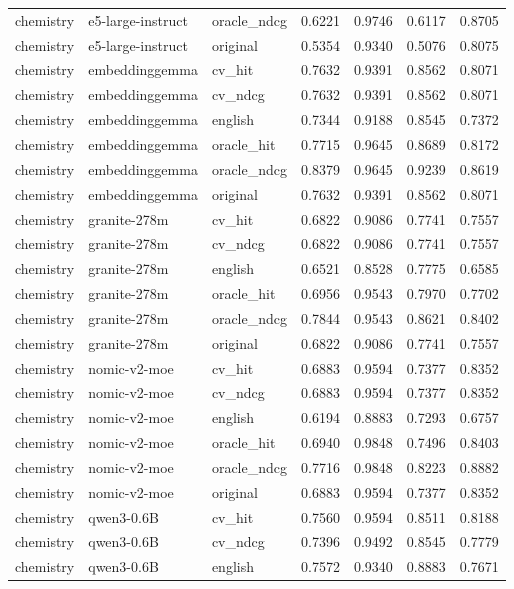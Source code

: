 \begin{tabular}{lllrrrr}
chemistry & e5-large-instruct & oracle\_ndcg & 0.6221 & 0.9746 & 0.6117 & 0.8705 \\
chemistry & e5-large-instruct & original & 0.5354 & 0.9340 & 0.5076 & 0.8075 \\
chemistry & embeddinggemma & cv\_hit & 0.7632 & 0.9391 & 0.8562 & 0.8071 \\
chemistry & embeddinggemma & cv\_ndcg & 0.7632 & 0.9391 & 0.8562 & 0.8071 \\
chemistry & embeddinggemma & english & 0.7344 & 0.9188 & 0.8545 & 0.7372 \\
chemistry & embeddinggemma & oracle\_hit & 0.7715 & 0.9645 & 0.8689 & 0.8172 \\
chemistry & embeddinggemma & oracle\_ndcg & 0.8379 & 0.9645 & 0.9239 & 0.8619 \\
chemistry & embeddinggemma & original & 0.7632 & 0.9391 & 0.8562 & 0.8071 \\
chemistry & granite-278m & cv\_hit & 0.6822 & 0.9086 & 0.7741 & 0.7557 \\
chemistry & granite-278m & cv\_ndcg & 0.6822 & 0.9086 & 0.7741 & 0.7557 \\
chemistry & granite-278m & english & 0.6521 & 0.8528 & 0.7775 & 0.6585 \\
chemistry & granite-278m & oracle\_hit & 0.6956 & 0.9543 & 0.7970 & 0.7702 \\
chemistry & granite-278m & oracle\_ndcg & 0.7844 & 0.9543 & 0.8621 & 0.8402 \\
chemistry & granite-278m & original & 0.6822 & 0.9086 & 0.7741 & 0.7557 \\
chemistry & nomic-v2-moe & cv\_hit & 0.6883 & 0.9594 & 0.7377 & 0.8352 \\
chemistry & nomic-v2-moe & cv\_ndcg & 0.6883 & 0.9594 & 0.7377 & 0.8352 \\
chemistry & nomic-v2-moe & english & 0.6194 & 0.8883 & 0.7293 & 0.6757 \\
chemistry & nomic-v2-moe & oracle\_hit & 0.6940 & 0.9848 & 0.7496 & 0.8403 \\
chemistry & nomic-v2-moe & oracle\_ndcg & 0.7716 & 0.9848 & 0.8223 & 0.8882 \\
chemistry & nomic-v2-moe & original & 0.6883 & 0.9594 & 0.7377 & 0.8352 \\
chemistry & qwen3-0.6B & cv\_hit & 0.7560 & 0.9594 & 0.8511 & 0.8188 \\
chemistry & qwen3-0.6B & cv\_ndcg & 0.7396 & 0.9492 & 0.8545 & 0.7779 \\
chemistry & qwen3-0.6B & english & 0.7572 & 0.9340 & 0.8883 & 0.7671 \\

\end{tabular}
